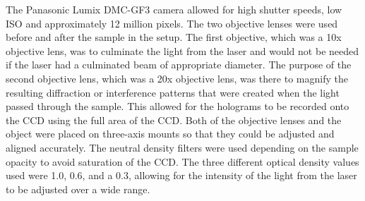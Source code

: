 The Panasonic Lumix DMC-GF3 camera allowed for high shutter speeds, low ISO
and approximately 12 million pixels.
The two objective lenses were used
before and after the sample in the setup. The first objective, which was a 10x
objective lens, was to %
culminate the light from the laser and would not be needed if the laser
had a culminated beam of appropriate diameter. The purpose of the second
objective lens, which was a 20x
objective lens, was there to
magnify the resulting diffraction or interference patterns that were created
when the light passed through the sample. This allowed for the holograms to be
recorded onto the CCD using the full area of the CCD.
Both of the objective lenses and the object were placed on
three-axis mounts so that they could be adjusted and aligned accurately.
The neutral density filters were used depending on the sample opacity to avoid
saturation of the CCD.
The three different optical density values used were 1.0, 0.6,
and a 0.3, allowing for the intensity of the light from the laser to be
adjusted over a wide range.


%

